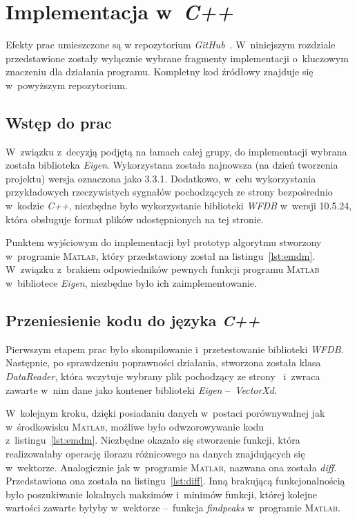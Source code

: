 \section{Implementacja w~\textit{C++}}
\indent

Efekty prac umieszczone są w repozytorium \textit{GitHub}~\cite{GIT}.
W~niniejszym rozdziale przedstawione zostały wyłącznie wybrane fragmenty
implementacji o~kluczowym znaczeniu dla działania programu. Kompletny kod
źródłowy znajduje się w~powyższym repozytorium.

\subsection{Wstęp do prac}
\indent

W~związku z~decyzją podjętą na łamach całej grupy, do implementacji wybrana
została biblioteka \textit{Eigen}. Wykorzystana została najnowsza (na dzień
tworzenia projektu) wersja oznaczona jako 3.3.1. Dodatkowo, w~celu wykorzystania
przykładowych rzeczywistych sygnałów pochodzących ze strony \cite{EKG-DB}
bezpośrednio w~kodzie \textit{C++}, niezbędne było wykorzystanie biblioteki
\textit{WFDB} w~wersji 10.5.24, która obsługuje format plików udostępnionych na
tej stronie.

Punktem wyjściowym do implementacji był prototyp algorytmu stworzony w~programie
\textsc{Matlab}, który przedstawiony został na listingu~\ref{lst:emdm}.
W~związku z~brakiem odpowiedników pewnych funkcji programu \textsc{Matlab}
w~bibliotece \textit{Eigen}, niezbędne było ich zaimplementowanie.

\subsection{Przeniesienie kodu do języka \textit{C++}}
\indent

Pierwszym etapem prac było skompilowanie i~przetestowanie biblioteki
\textit{WFDB}. Następnie, po sprawdzeniu poprawności działania, stworzona
została klasa \textit{DataReader}, która wczytuje wybrany plik pochodzący ze
strony~\cite{EKG-DB} i~zwraca zawarte w~nim dane jako kontener biblioteki
\textit{Eigen} --~\textit{VectorXd}.

W~kolejnym kroku, dzięki posiadaniu danych w~postaci porównywalnej jak
w~środkowisku \textsc{Matlab}, możliwe było odwzorowywanie kodu
z~listingu~\ref{lst:emdm}. Niezbędne okazało się stworzenie funkcji, która
realizowałaby operację ilorazu różnicowego na danych znajdujących się
w~wektorze. Analogicznie jak w~programie \textsc{Matlab}, nazwana ona została
\textit{diff}. Przedstawiona ona została na listingu~\ref{lst:diff}. Inną
brakującą funkcjonalnością było poszukiwanie lokalnych maksimów i~minimów
funkcji, której kolejne wartości zawarte byłyby w~wektorze --~funkcja
\textit{findpeaks} w~programie \textsc{Matlab}.

